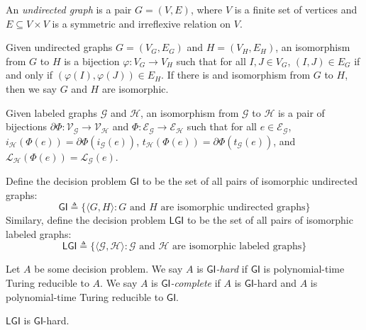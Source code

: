 \documentclass[hidelinks]{article}
\newcommand{\Lc}{\mathcal{L}}  %
\newcommand{\Gc}{\mathcal{G}}  %
\newcommand{\Hc}{\mathcal{H}}  %
\newcommand{\Vc}{\mathcal{V}}
\newcommand{\Ec}{\mathcal{E}}
\newcommand{\term}[1]{\textit{#1}}
\newcommand{\GI}{\textsf{GI}}
\newcommand{\LGI}{\textsf{LGI}}
\theoremstyle{definition}
\begin{document}
\begin{definition}
    An \term{undirected graph} is a pair \(G = (V, E)\), where \(V\) is a 
    finite set of vertices and \(E \subseteq V \times V\) is a symmetric and irreflexive relation
    on \(V\).
\end{definition}

\begin{definition}
    Given undirected graphs \(G = (V_G, E_G)\) and \(H = (V_H, E_H)\), an isomorphism from \(G\) to \(H\)
    is a bijection \(\varphi : V_G \to V_H\) such that for all \(I, J \in V_G\), 
    \((I, J) \in E_G\) if and only if \((\varphi(I), \varphi(J)) \in E_H\). If there is 
    and isomorphism from \(G\) to \(H\), then we say \(G\) and \(H\) are isomorphic.

    Given labeled graphs \(\Gc\) and \(\Hc\), an isomorphism from \(\Gc\) to \(\Hc\) 
    is a pair of bijections \(\partial\Phi : \Vc_\Gc \to \Vc_\Hc\) and \(\Phi : \Ec_\Gc \to \Ec_\Hc\)
    such that for all \(e \in \Ec_\Gc\), \(i_\Hc(\Phi(e)) = \partial\Phi(i_\Gc(e))\), 
    \(t_\Hc(\Phi(e)) = \partial\Phi(t_\Gc(e))\), and \(\Lc_\Hc(\Phi(e)) = \Lc_\Gc(e)\).
\end{definition}

\begin{definition}
    Define the decision problem \(\GI\) to be the set of all pairs of isomorphic undirected graphs:
    \[\GI \triangleq \{ \langle G, H \rangle : G \text{ and } H \text{ are isomorphic undirected graphs} \}\]
    Similary, define the decision problem \(\LGI\) to be the set of all pairs of isomorphic labeled graphs:
    \[\LGI \triangleq \{ \langle \Gc, \Hc \rangle : \Gc \text{ and } \Hc \text{ are isomorphic labeled graphs} \}\]
\end{definition}

\begin{definition}
    Let \(A\) be some decision problem. We say \(A\) is \term{\(\GI\)-hard} if \(\GI\) is polynomial-time Turing reducible 
    to \(A\). We say \(A\) is \term{\(\GI\)-complete} if \(A\) is \(\GI\)-hard and \(A\) is polynomial-time
    Turing reducible to \(\GI\).
\end{definition}

\begin{theorem}
    \(\LGI\) is \(\GI\)-hard.
\end{theorem}
\end{document}
